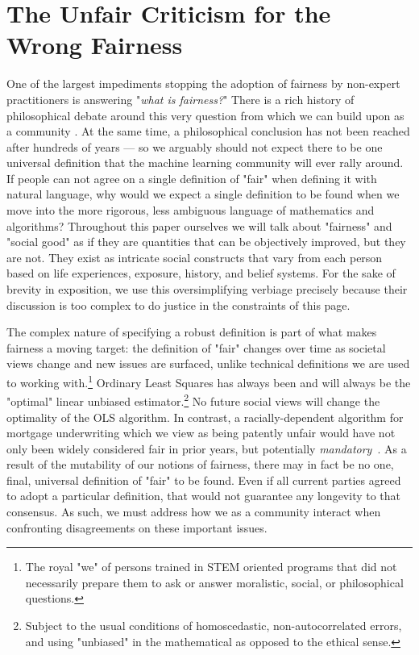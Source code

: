 \documentclass[11pt]{article}
\begin{document}
\section{The Unfair Criticism for the Wrong Fairness} \label{sec:which_fairness}

One of the largest impediments stopping the adoption of fairness by non-expert practitioners is answering "\textit{what is fairness?}"
There is a rich history of philosophical debate around this very question from which we can build upon as a community \cite{pmlr-v81-binns18a}. At the same time, a philosophical conclusion has not been reached after hundreds of years --- so we arguably should not expect there to be one universal definition that the machine learning community will ever rally around.
If people can not agree on a single definition of "fair" when defining it with natural language, why would we expect a single definition to be found when we move into the more rigorous, less ambiguous language of mathematics and algorithms? 
Throughout this paper ourselves we will talk about "fairness" and "social good" as if they are quantities that can be objectively improved, but they are not. They exist as intricate social constructs that vary from each person based on life experiences, exposure, history, and belief systems. For the sake of brevity in exposition, we use this oversimplifying verbiage precisely because their discussion is too complex to do justice in the constraints of this page.

The complex nature of specifying a robust definition is part of what makes
fairness a moving target: the definition of "fair" changes over time as societal views change and new issues are surfaced, unlike technical definitions we are used to working with.\footnote{The royal "we" of persons trained in STEM oriented programs that did not necessarily prepare them to ask or answer moralistic, social, or philosophical questions.}
Ordinary Least Squares has always been and will always be the "optimal" linear unbiased estimator.\footnote{Subject to the usual conditions of homoscedastic, non-autocorrelated errors, and using "unbiased" in the mathematical as opposed to the ethical sense.} No future social views will change the optimality of the OLS algorithm. In contrast, a racially-dependent algorithm for mortgage underwriting which we view as being patently unfair would have not only been widely considered fair in prior years, but potentially \emph{mandatory}~\cite{kimble2007insuring}.
As a result of the mutability of our notions of fairness, there may in fact be no one, final, universal definition of "fair" to be found.
Even if all current parties agreed to adopt a particular definition, that would not guarantee any longevity to that consensus. As such, we must address how we as a community interact when confronting disagreements on these important issues. 
\end{document}
